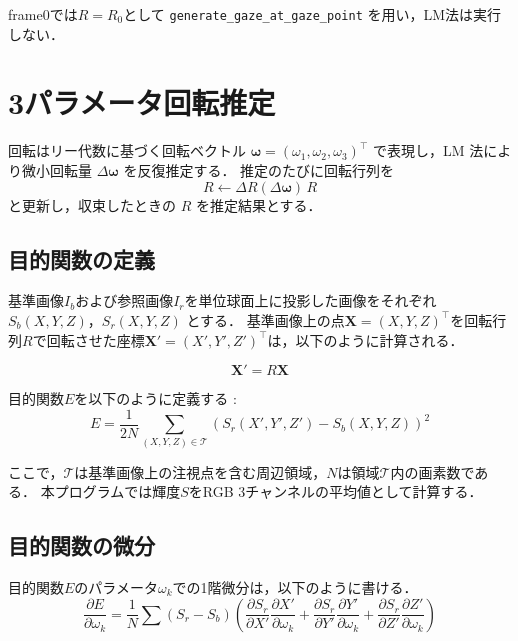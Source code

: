 \documentclass{ltjsarticle}          %
\begin{document}
frame0では$R = R_0$として \texttt{generate\_gaze\_at\_gaze\_point} を用い，LM法は実行しない．

\section{3パラメータ回転推定}
回転はリー代数に基づく回転ベクトル $\boldsymbol{\omega} = (\omega_1, \omega_2, \omega_3)^\top$
で表現し，LM 法により微小回転量 $\Delta\boldsymbol{\omega}$ を反復推定する．
推定のたびに回転行列を
\begin{equation}
  R \leftarrow \Delta R(\Delta\bm{\omega})\,R
  \label{eq:R_update}
\end{equation}
と更新し，収束したときの $R$ を推定結果とする．

\subsection{目的関数の定義}
基準画像$I_b$および参照画像$I_r$を単位球面上に投影した画像をそれぞれ $S_b(X,Y,Z)$，$S_r(X,Y,Z)$ とする．
基準画像上の点$\bm{X} = (X, Y, Z)^\top$を回転行列$R$で回転させた座標$\bm{X}' = (X', Y', Z')^\top$は，以下のように計算される．

\begin{equation}
  \bm{X}' = R\bm{X}
  \label{eq:rotation}
\end{equation}

目的関数$E$を以下のように定義する :
\begin{equation}
  E = \dfrac{1}{2N} \sum_{(X,Y,Z) \in \mathcal{T}} \left( S_r(X', Y', Z') - S_b(X, Y, Z) \right)^2
  \label{eq:E_def}
\end{equation}

ここで，$\mathcal{T}$は基準画像上の注視点を含む周辺領域，$N$は領域$\mathcal{T}$内の画素数である．
本プログラムでは輝度$S$をRGB 3チャンネルの平均値として計算する．

\subsection{目的関数の微分}
目的関数$E$のパラメータ$\omega_k$での1階微分は，以下のように書ける．
\begin{equation}
  \dfrac{\partial E}{\partial \omega_k} = \dfrac{1}{N} \sum (S_r - S_b) \left( \dfrac{\partial S_r}{\partial X'} \dfrac{\partial X'}{\partial \omega_k} + \dfrac{\partial S_r}{\partial Y'} \dfrac{\partial Y'}{\partial \omega_k} + \dfrac{\partial S_r}{\partial Z'} \dfrac{\partial Z'}{\partial \omega_k} \right)
  \label{eq:first_derivative}
\end{equation}
\end{document}
